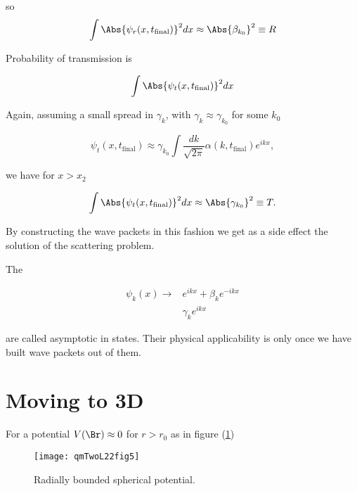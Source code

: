 so
\begin{equation}\label{eqn:qmTwoL22:430}
\int \Abs{\psi_r(x, t_{\text{final}})}^2 dx
\approx \Abs{\beta_{k_0}}^2 \equiv R
\end{equation}

Probability of transmission is

\begin{equation}\label{eqn:qmTwoL22:450}
\int \Abs{\psi_t(x, t_{\text{final}})}^2 dx
\end{equation}

Again, assuming a small spread in $\gamma_k$, with $\gamma_k \approx \gamma_{k_0}$ for some $k_0$

\begin{equation}\label{eqn:qmTwoL22:470}
\psi_t(x, t_{\text{final}}) \approx \gamma_{k_0}
\int \frac{dk}{\sqrt{2 \pi}} \alpha(k, t_{\text{final}}) e^{i k x},
\end{equation}

we have for $x > x_2$

\begin{equation}\label{eqn:qmTwoL22:490}
\int \Abs{\psi_t(x, t_{\text{final}})}^2 dx
\approx \Abs{\gamma_{k_0}}^2 \equiv T.
\end{equation}

By constructing the wave packets in this fashion we get as a side effect the solution of the scattering problem.

The

\begin{align*}
\psi_k(x) \rightarrow & e^{i k x} + \beta_k e^{-i k x} \\
& \gamma_k e^{i k x}
\end{align*}

are called asymptotic in states.  Their physical applicability is only once we have built wave packets out of them.

\section{Moving to 3D}

For a potential $V(\Br) \approx 0$ for $r > r_0$ as in figure (\ref{fig:qmTwoL22:qmTwoL22fig5})

\begin{figure}[htp]
   \centering
   \texttt{[image: qmTwoL22fig5]}
   \caption{Radially bounded spherical potential.}\label{fig:qmTwoL22:qmTwoL22fig5}
\end{figure}

